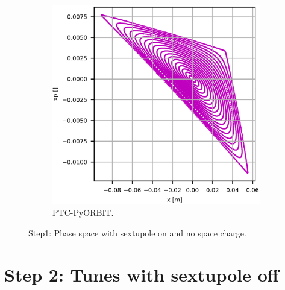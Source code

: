 \documentclass[a4paper]{cernatsnote}
\begin{document}
\begin{figure}
\begin{subfigure}{.5\textwidth}
          \includegraphics[width=\textwidth]{Step1_phase-space_PO.png}
          \caption{PTC-PyORBIT.}
          \label{fig:step1_po}
        \end{subfigure}
        \caption{Step1: Phase space with sextupole on and no space charge.}
        \label{fig:step1}
\end{figure}




\section{Step 2: Tunes with sextupole off}
\end{document}
